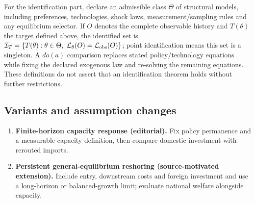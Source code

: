 \documentclass[11pt,a4paper]{article}
\begin{document}
For the identification part, declare an admissible class \(\Theta\) of structural models, including preferences, technologies, shock laws, measurement/sampling rules and any equilibrium selector. If \(O\) denotes the complete observable history and \(T(\theta)\) the target defined above, the identified set is \(\mathcal I_T=\{T(\theta):\theta\in\Theta,\ \mathcal L_\theta(O)=\mathcal L_{\rm obs}(O)\}\); point identification means this set is a singleton. A \(do(a)\) comparison replaces stated policy/technology equations while fixing the declared exogenous law and re-solving the remaining equations. These definitions do not assert that an identification theorem holds without further restrictions.
\subsection*{Variants and assumption changes}
\begin{enumerate}
\item \textbf{Finite-horizon capacity response (editorial).} Fix policy permanence and a measurable capacity definition, then compare domestic investment with rerouted imports.
\item \textbf{Persistent general-equilibrium reshoring (source-motivated extension).} Include entry, downstream costs and foreign investment and use a long-horizon or balanced-growth limit; evaluate national welfare alongside capacity.
\end{enumerate}
\end{document}
